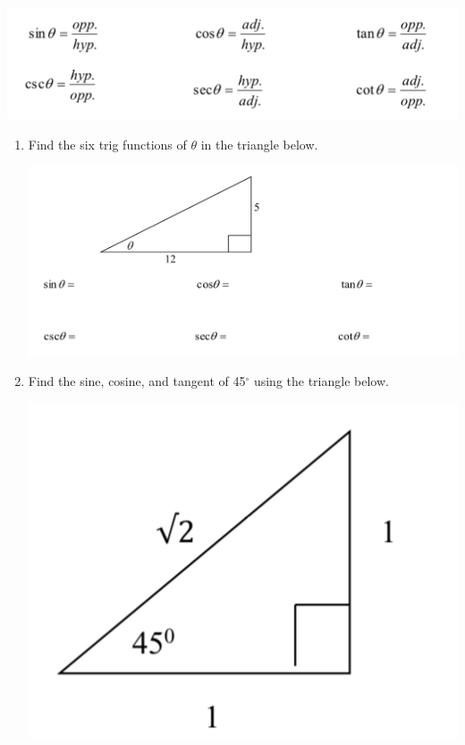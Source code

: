 \begin{center}
\includegraphics[scale=.6]{trigdef}\\
\end{center}

\newpage





\begin{enumerate}
\item Find the six trig functions of $\theta$ in the triangle below.
\begin{center}
\includegraphics[scale=.6]{trigex1}\\
\end{center}

\item Find the sine, cosine, and tangent of 45$^{\circ}$ using the triangle below.

\includegraphics[scale=.6]{trigex2}\\



\end{enumerate}
